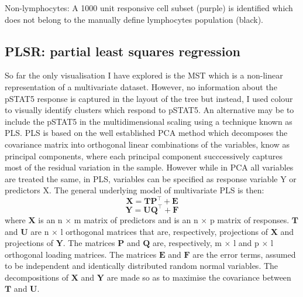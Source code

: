 { Non-lymphocytes: A 1000 unit responsive cell subset (purple) is identified which does not belong to the manually define lymphocytes population (black).  }
{
}


\clearpage


\subsection{PLSR: partial least squares regression}

So far the only visualisation  I have explored is the \gls{MST} which is a non-linear representation of a multivariate dataset.
However, no information about the pSTAT5 response is captured in the layout of the tree but instead, I used colour to visually identify clusters which respond to pSTAT5.
An alternative may be to include the pSTAT5 in the multidimensional scaling using a technique known as \acrfull{PLS}.
\gls{PLS} is based on the well established \gls{PCA} method which decomposes the covariance matrix into orthogonal linear combinations of the variables, know as principal components, where each principal component succcessively captures most of the residual variation in the sample.
However while in PCA all variables are treated the same, in PLS, variables can be specified as response variable Y or predictors X.
The general underlying model of multivariate PLS is then:
\[
    \pmb{X} = \pmb{T} \pmb{P}^{\top} + \pmb{E}
\]
\[
    \pmb{Y} = \pmb{U} \pmb{Q}^{\top} + \pmb{F}
\]
where $\pmb{X}$ is an n $\times$ m matrix of predictors and  is an n $\times$ p matrix of responses.
$\pmb{T}$ and $\pmb{U}$ are n $\times$ l orthogonal matrices that are, respectively, projections of $\pmb{X}$ and projections of $\pmb{Y}$.
The matrices $\pmb{P}$ and $\pmb{Q}$ are, respectively, m $\times$ l and p $\times$ l orthogonal loading matrices.
The matrices $\pmb{E}$ and $\pmb{F}$ are the error terms, assumed to be independent and identically distributed random normal variables.  
The decompositions of $\pmb{X}$ and $\pmb{Y}$ are made so as to maximise the covariance between $\pmb{T}$ and $\pmb{U}$.

